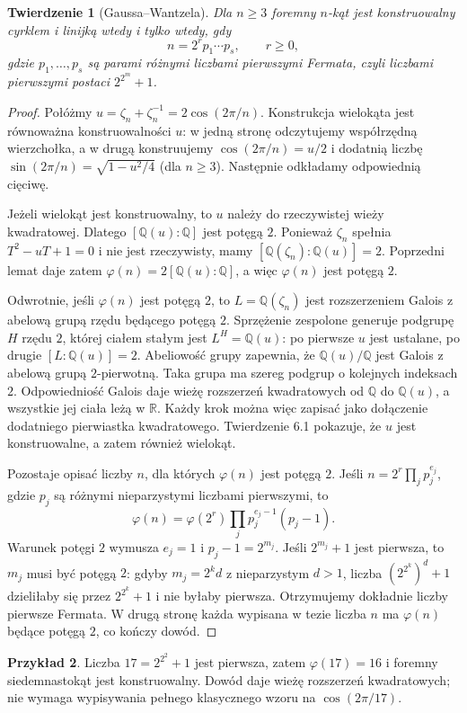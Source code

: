 \documentclass[11pt,a4paper,oneside]{book}
\numberwithin{equation}{section}
\theoremstyle{plain}
\newtheorem{twierdzenie}{Twierdzenie}[chapter]
\theoremstyle{definition}
\newtheorem{przyklad}[twierdzenie]{Przykład}
\theoremstyle{remark}
\newcommand{\Q}{\mathbb{Q}}
\newcommand{\R}{\mathbb{R}}
\begin{document}
\begin{twierdzenie}[Gaussa--Wantzela]
Dla $n\ge3$ foremny $n$-kąt jest konstruowalny cyrklem i linijką wtedy i tylko wtedy, gdy
\[
n=2^r p_1\cdots p_s,\qquad r\ge0,
\]
gdzie $p_1,\ldots,p_s$ są parami różnymi liczbami pierwszymi Fermata, czyli liczbami pierwszymi postaci $2^{2^m}+1$.
\end{twierdzenie}
\begin{proof}
Połóżmy $u=\zeta_n+\zeta_n^{-1}=2\cos(2\pi/n)$. Konstrukcja wielokąta jest równoważna konstruowalności $u$: w jedną stronę odczytujemy współrzędną wierzchołka, a w drugą konstruujemy $\cos(2\pi/n)=u/2$ i dodatnią liczbę $\sin(2\pi/n)=\sqrt{1-u^2/4}$ (dla $n\ge3$). Następnie odkładamy odpowiednią cięciwę.

Jeżeli wielokąt jest konstruowalny, to $u$ należy do rzeczywistej wieży kwadratowej. Dlatego $[\Q(u):\Q]$ jest potęgą $2$. Ponieważ $\zeta_n$ spełnia $T^2-uT+1=0$ i nie jest rzeczywisty, mamy $[\Q(\zeta_n):\Q(u)]=2$. Poprzedni lemat daje zatem $\varphi(n)=2[\Q(u):\Q]$, a więc $\varphi(n)$ jest potęgą $2$.

Odwrotnie, jeśli $\varphi(n)$ jest potęgą $2$, to $L=\Q(\zeta_n)$ jest rozszerzeniem Galois z abelową grupą rzędu będącego potęgą $2$. Sprzężenie zespolone generuje podgrupę $H$ rzędu $2$, której ciałem stałym jest $L^H=\Q(u)$: po pierwsze $u$ jest ustalane, po drugie $[L:\Q(u)]=2$. Abeliowość grupy zapewnia, że $\Q(u)/\Q$ jest Galois z abelową grupą $2$-pierwotną. Taka grupa ma szereg podgrup o kolejnych indeksach $2$. Odpowiedniość Galois daje wieżę rozszerzeń kwadratowych od $\Q$ do $\Q(u)$, a wszystkie jej ciała leżą w $\R$. Każdy krok można więc zapisać jako dołączenie dodatniego pierwiastka kwadratowego. Twierdzenie 6.1 pokazuje, że $u$ jest konstruowalne, a zatem również wielokąt.

Pozostaje opisać liczby $n$, dla których $\varphi(n)$ jest potęgą $2$. Jeśli $n=2^r\prod_j p_j^{e_j}$, gdzie $p_j$ są różnymi nieparzystymi liczbami pierwszymi, to
\[
\varphi(n)=\varphi(2^r)\prod_j p_j^{e_j-1}(p_j-1).
\]
Warunek potęgi $2$ wymusza $e_j=1$ i $p_j-1=2^{m_j}$. Jeśli $2^{m_j}+1$ jest pierwsza, to $m_j$ musi być potęgą $2$: gdyby $m_j=2^k d$ z nieparzystym $d>1$, liczba $(2^{2^k})^d+1$ dzieliłaby się przez $2^{2^k}+1$ i nie byłaby pierwsza. Otrzymujemy dokładnie liczby pierwsze Fermata. W drugą stronę każda wypisana w tezie liczba $n$ ma $\varphi(n)$ będące potęgą $2$, co kończy dowód.
\end{proof}

\begin{przyklad}
Liczba $17=2^{2^2}+1$ jest pierwsza, zatem $\varphi(17)=16$ i foremny siedemnastokąt jest konstruowalny. Dowód daje wieżę rozszerzeń kwadratowych; nie wymaga wypisywania pełnego klasycznego wzoru na $\cos(2\pi/17)$.
\end{przyklad}
\end{document}
